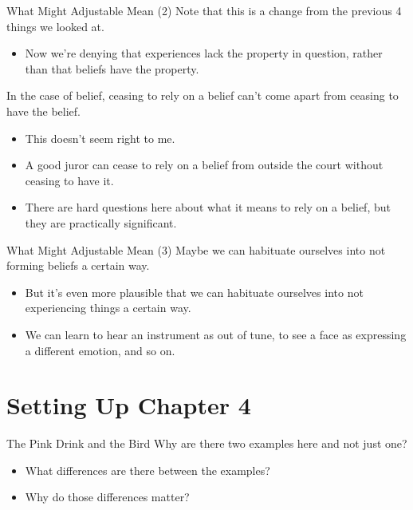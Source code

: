 \documentclass[
  17pt,
  letterpaper,
  ignorenonframetext,
  aspectratio=169,
  xcolor={dvipsnames}]{beamer}
\providecommand{\tightlist}{%
  \setlength{\itemsep}{0pt}\setlength{\parskip}{0pt}}\usepackage{longtable,booktabs,array}
\begin{document}
\begin{frame}{What Might Adjustable Mean (2)}
\protect\hypertarget{what-might-adjustable-mean-2-1}{}
Note that this is a change from the previous 4 things we looked at.

\begin{itemize}[<+->]
\tightlist
\item
  Now we're denying that experiences lack the property in question,
  rather than that beliefs have the property.
\end{itemize}

\end{frame} \begin{frame}[plain]

In the case of belief, ceasing to rely on a belief can't come apart from
ceasing to have the belief.

\begin{itemize}[<+->]
\tightlist
\item
  This doesn't seem right to me.
\item
  A good juror can cease to rely on a belief from outside the court
  without ceasing to have it.
\item
  There are hard questions here about what it means to rely on a belief,
  but they are practically significant.
\end{itemize}
\end{frame}

\begin{frame}{What Might Adjustable Mean (3)}
\protect\hypertarget{what-might-adjustable-mean-3}{}
Maybe we can habituate ourselves into not forming beliefs a certain way.

\begin{itemize}[<+->]
\tightlist
\item
  But it's even more plausible that we can habituate ourselves into not
  experiencing things a certain way.
\item
  We can learn to hear an instrument as out of tune, to see a face as
  expressing a different emotion, and so on.
\end{itemize}
\end{frame}

\hypertarget{setting-up-chapter-4}{%
\section{Setting Up Chapter 4}\label{setting-up-chapter-4}}

\begin{frame}{The Pink Drink and the Bird}
\protect\hypertarget{the-pink-drink-and-the-bird}{}
Why are there two examples here and not just one?

\begin{itemize}[<+->]
\tightlist
\item
  What differences are there between the examples?
\item
  Why do those differences matter?
\end{itemize}
\end{frame}
\end{document}
